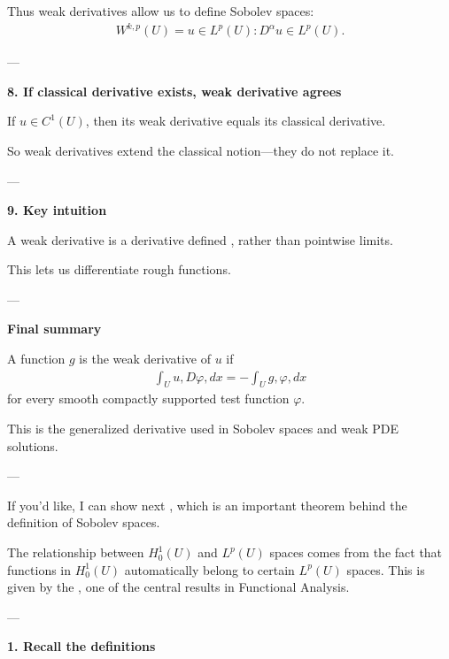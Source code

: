 \documentclass[12pt,a4paper]{report}
\begin{document}
\begin{description}
\begin{description}
Thus weak derivatives allow us to define Sobolev spaces:
\begin{align*}
W^{k,p}(U) = {u\in L^p(U): D^\alpha u\in L^p(U)}.
\end{align*}

---

\item \textbf{8. If classical derivative exists, weak derivative agrees}

If $u\in C^1(U)$, then its weak derivative equals its classical derivative.

So weak derivatives extend the classical notion—they do not replace it.

---

\item \textbf{9. Key intuition}

A weak derivative is a derivative defined , rather than pointwise limits.

This lets us differentiate rough functions.

---

\item \textbf{Final summary}

A function $g$ is the weak derivative of $u$ if
\begin{align*}
\int_U u,D\varphi,dx = -\int_U g,\varphi,dx
\end{align*}
for every smooth compactly supported test function $\varphi$.

This is the generalized derivative used in Sobolev spaces and weak PDE solutions.

---
\end{description}

If you'd like, I can show next , which is an important theorem behind the definition of Sobolev spaces.


	\newpage
	\item {}

The relationship between $H_0^1(U)$ and $L^p(U)$ spaces comes from the fact that functions in $H_0^1(U)$ automatically belong to certain $L^p(U)$ spaces. This is given by the , one of the central results in Functional Analysis.

---
\begin{description}

\item \textbf{1. Recall the definitions}


\end{description}
\end{description}
\end{document}
